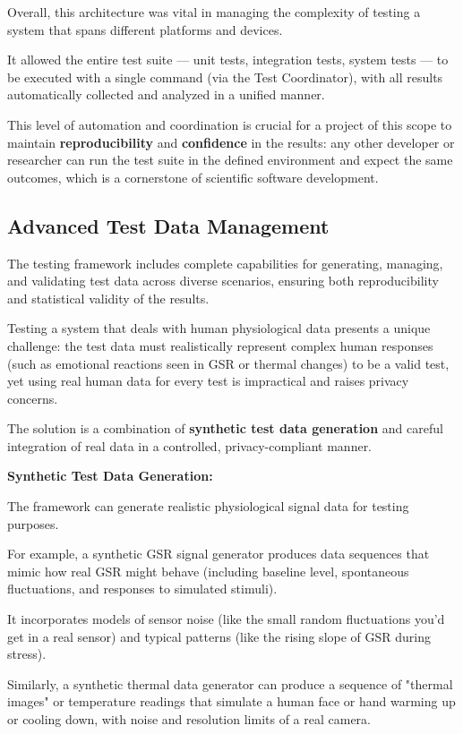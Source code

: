 {{{Overall, this architecture was vital in managing the complexity of testing a system that spans different platforms and devices.

It allowed the entire test suite --- unit tests, integration tests, system tests --- to be executed with a single command (via the Test Coordinator), with all results automatically collected and analyzed in a unified manner.

This level of automation and coordination is crucial for a project of this scope to maintain \textbf{reproducibility}
 and \textbf{confidence}
 in the results: any other developer or researcher can run the test suite in the defined environment and expect the same outcomes, which is a cornerstone of scientific software development.

\subsection{Advanced Test Data Management}

The testing framework includes complete capabilities for generating, managing, and validating test data across diverse scenarios, ensuring both reproducibility and statistical validity of the results.

Testing a system that deals with human physiological data presents a unique challenge: the test data must realistically represent complex human responses (such as emotional reactions seen in GSR or thermal changes) to be a valid test, yet using real human data for every test is impractical and raises privacy concerns.

The solution is a combination of \textbf{synthetic test data generation}
 and careful integration of real data in a controlled, privacy-compliant manner.

\textbf{Synthetic Test Data Generation:}

The framework can generate realistic physiological signal data for testing purposes.

For example, a synthetic GSR signal generator produces data sequences that mimic how real GSR might behave (including baseline level, spontaneous fluctuations, and responses to simulated stimuli).

It incorporates models of sensor noise (like the small random fluctuations you'd get in a real sensor) and typical patterns (like the rising slope of GSR during stress).

Similarly, a synthetic thermal data generator can produce a sequence of "thermal images" or temperature readings that simulate a human face or hand warming up or cooling down, with noise and resolution limits of a real camera.

}}}
